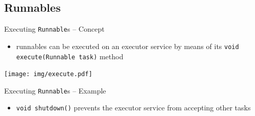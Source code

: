 \documentclass{beamer}\mode<presentation>{\usetheme{AMSBolognaFC}}
\begin{document}
\subsection{Runnables}

\begin{frame}[c,allowframebreaks]{Executing \texttt{Runnable}s -- Concept}

	

	\framebreak

	\begin{itemize}
		\item runnables can be \alert{executed} on an executor service by means of its \texttt{void execute(Runnable task)} method
	\end{itemize}
	\begin{center}
		\texttt{[image: img/execute.pdf]}
	\end{center}

\end{frame}

\begin{frame}[c]{Executing \texttt{Runnable}s -- Example}

	

	\vfill

	\begin{itemize}
		\item \texttt{void shutdown()} prevents the executor service from accepting other tasks
	\end{itemize}

\end{frame}
\end{document}
